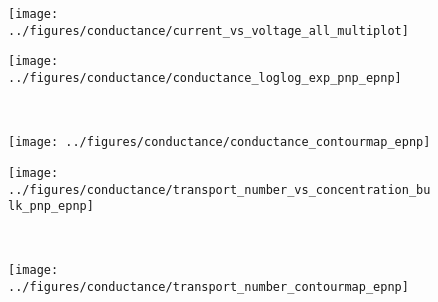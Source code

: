 \begin{figure*}[!p]
  \centering
  \begin{minipage}[l]{16cm}
    \begin{minipage}[h]{5cm}
      \begin{subfigure}[t]{4.5cm}
        \centering
        \caption{}\vspace{-3mm}\label{fig:current-voltage_curves}
        \texttt{[image: ../figures/conductance/current\_vs\_voltage\_all\_multiplot]}
      \end{subfigure}
    \end{minipage}
    \begin{minipage}[h]{5cm}
      \begin{subfigure}[t]{5cm}
        \centering
        \caption{}\vspace{0mm}\label{fig:conductance_loglog_exp_pnp_epnp}
        \texttt{[image: ../figures/conductance/conductance\_loglog\_exp\_pnp\_epnp]}
      \end{subfigure}
      \\
      \begin{subfigure}[t]{5cm}
        \centering
        \caption{}\vspace{0mm}\label{fig:conductance_contourmap_epnp}
        \texttt{[image: ../figures/conductance/conductance\_contourmap\_epnp]}
      \end{subfigure}
    \end{minipage}
    \begin{minipage}[h]{5cm}
      \begin{subfigure}[t]{5cm}
        \centering
        \caption{}\vspace{0mm}\label{fig:transport_number_vs_concentration_bulk_pnp_epnp}
        \texttt{[image: ../figures/conductance/transport\_number\_vs\_concentration\_bulk\_pnp\_epnp]}
      \end{subfigure}
      \\
      \begin{subfigure}[t]{5cm}
        \centering
        \caption{}\vspace{0mm}\label{fig:transport_number_contourmap_epnp}
        \texttt{[image: ../figures/conductance/transport\_number\_contourmap\_epnp]}
      \end{subfigure}
    \end{minipage}
  \end{minipage}


\end{figure*}
